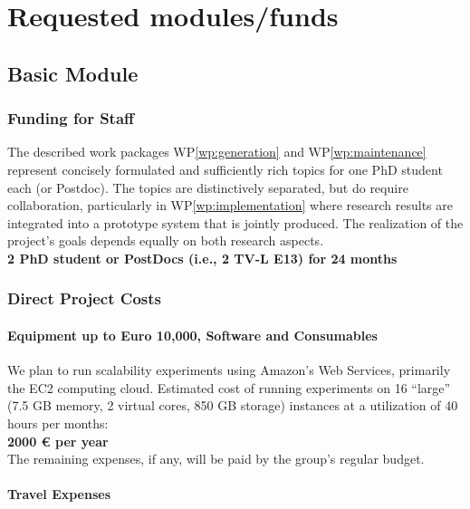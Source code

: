 \newpage
\section{Requested modules/funds}


\subsection{Basic Module}

	\subsubsection{Funding for Staff}

		The described work packages WP\ref{wp:generation} and WP\ref{wp:maintenance} represent concisely formulated and sufficiently rich topics for one PhD student each (or Postdoc). 
		The topics are distinctively separated, but do require collaboration, particularly in WP\ref{wp:implementation} where research results are integrated into a prototype system
		that is jointly produced. The realization of the project's goals depends equally on both research aspects.\\

		{\bf 2 PhD student or PostDocs (i.e., 2 TV-L E13) for 24 months}
		

	\subsubsection{Direct Project Costs}

		\paragraph{Equipment up to Euro 10,000, Software and Consumables}$\,$\medskip\\

			We plan to run scalability experiments using Amazon's Web Services, primarily the EC2 computing cloud.
			Estimated cost of running experiments on 16 ``large'' (7.5 GB memory, 2 virtual cores, 850 GB storage) 
			instances at a utilization of 40 hours per months:\\

			{\bf	2000 \euro\xspace per year}\\

			\noindent The remaining expenses, if any, will be paid by the group's regular budget.			

		\paragraph{Travel Expenses}$\,$\medskip\\

